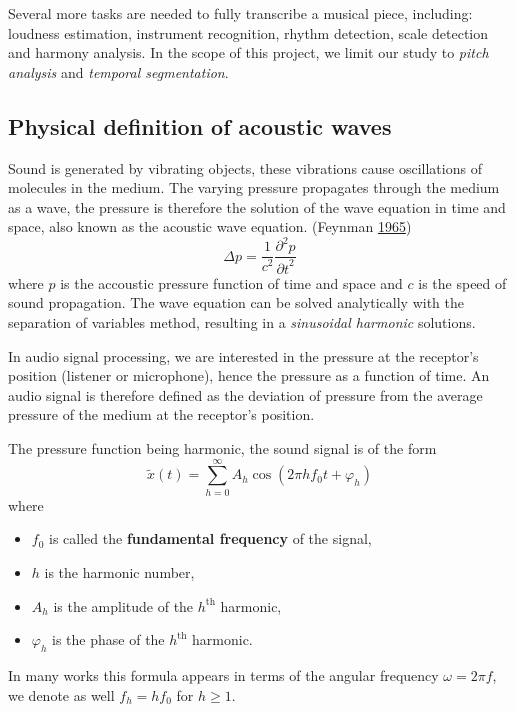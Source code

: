 \documentclass[
  american,
]{article}
\providecommand{\tightlist}{%
  \setlength{\itemsep}{0pt}\setlength{\parskip}{0pt}}
\begin{document}
Several more tasks are needed to fully transcribe a musical
piece, including: loudness estimation, instrument recognition,
rhythm detection, scale detection and harmony analysis.
In the scope of this project, we limit our study to
\emph{pitch analysis} and \emph{temporal segmentation}.

\hypertarget{physical-definition-of-acoustic-waves}{%
\subsection{Physical definition of acoustic waves}\label{physical-definition-of-acoustic-waves}}

Sound is generated by vibrating objects, these vibrations
cause oscillations of molecules in the medium.
The varying pressure propagates through the medium as a wave,
the pressure is therefore the solution of the wave
equation in time and space, also known as the acoustic
wave equation. (Feynman \protect\hyperlink{ref-feynman}{1965})
\[\Delta p =\frac{1}{c^2}\frac{\partial^2 p}{ {\partial t}^2}\]
where \(p\) is the accoustic pressure function of time and space
and \(c\) is the speed of sound propagation.
The wave equation can be solved analytically with the
separation of variables method, resulting in a \emph{sinusoidal
harmonic} solutions.

In audio signal processing, we are interested in the pressure
at the receptor's position (listener or microphone),
hence the pressure as a function of time.
An audio signal is therefore defined as the deviation
of pressure from the average pressure of the medium
at the receptor's position.

The pressure function being harmonic, the sound signal
is of the form
\[\tilde{x}(t) = \sum_{h=0}^{\infty} A_h \cos(2\pi hf_0t + \varphi_h)\]
where

\begin{itemize}
\tightlist
\item
  \(f_0\) is called the \textbf{fundamental frequency} of the signal,
\item
  \(h\) is the harmonic number,
\item
  \(A_h\) is the amplitude of the \(h^\text{th}\) harmonic,
\item
  \(\varphi_h\) is the phase of the \(h^\text{th}\) harmonic.
\end{itemize}

In many works this formula appears in terms of the angular
frequency \(\omega=2\pi f\), we denote as well
\(f_h = h f_0\) for \(h\geq 1\).
\end{document}
